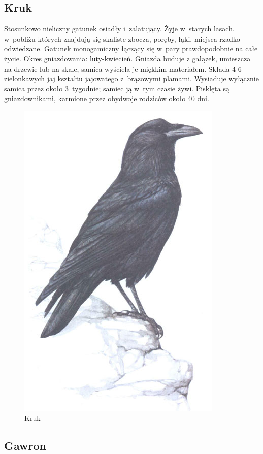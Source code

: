 \documentclass[a4paper,10pt]{article}
\begin{document}
\subsection{Kruk}

Stosunkowo nieliczny gatunek osiadły i~zalatujący. Żyje w~starych lasach, w~pobliżu których znajdują się skaliste zbocza, poręby, łąki, miejsca rzadko odwiedzane. Gatunek monogamiczny łączący się w~pary prawdopodobnie na całe życie. Okres gniazdowania: luty-kwiecień. Gniazda buduje z gałązek, umieszcza na drzewie lub na skale, samica wyściela je miękkim materiałem. Składa 4-6 zielonkawych jaj kształtu jajowatego z~brązowymi plamami. Wysiaduje wyłącznie samica przez około 3~tygodnie; samiec ją w~tym czasie żywi. Pisklęta są gniazdownikami, karmione przez obydwoje rodziców około 40 dni. 

\begin{figure}
\centerline{\includegraphics[scale=0.4]{kruk}}
\caption{Kruk}
\end{figure}

\subsection{Gawron}
\end{document}
